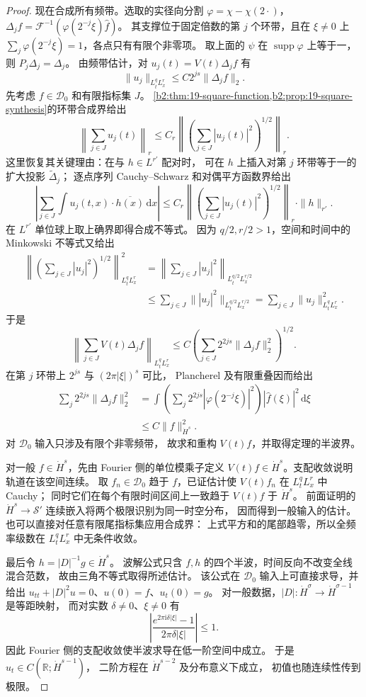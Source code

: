 \begin{proof}
现在合成所有频带。选取的实径向分割
\(\varphi=\chi-\chi(2\cdot)\)，
\(\Delta_jf=\mathcal F^{-1}(\varphi(2^{-j}\xi)\widehat f)\)。
其支撑位于固定倍数的第 \(j\) 个环带，且在 \(\xi\ne0\) 上
\(\sum_j\varphi(2^{-j}\xi)=1\)，各点只有有限个非零项。
取上面的 \(\psi\) 在 \(\operatorname{supp}\varphi\) 上等于一，
则 \(P_j\Delta_j=\Delta_j\)。
由频带估计，对 \(u_j(t)=V(t)\Delta_jf\) 有
\[
 \|u_j\|_{L^q_tL^r_x}\le C2^{js}\|\Delta_jf\|_2.
\]
先考虑 \(f\in\mathcal D_0\) 和有限指标集 \(J\)。
\cref{b2:thm:19-square-function,b2:prop:19-square-synthesis}的环带合成界给出
\[
 \left\|\sum_{j\in J}u_j(t)\right\|_r
 \le C_r\left\|\left(\sum_{j\in J}|u_j(t)|^2\right)^{1/2}\right\|_r.
\]
这里恢复其关键理由：在与 \(h\in L^{r'}\) 配对时，
可在 \(h\) 上插入对第 \(j\) 环带等于一的扩大投影 \(\widetilde\Delta_j\)；
逐点序列 Cauchy--Schwarz 和对偶平方函数界给出
\[
 \left|\sum_{j\in J}\int u_j(t,x)\cdot\overline{h(x)}\,\mathrm dx\right|
 \le C_r
 \left\|\left(\sum_{j\in J}|u_j(t)|^2\right)^{1/2}\right\|_r
 \cdot\|h\|_{r'}.
\]
在 \(L^{r'}\) 单位球上取上确界即得合成不等式。
因为 \(q/2,r/2>1\)，空间和时间中的 Minkowski 不等式又给出
\[
 \begin{aligned}
 \left\|\left(\sum_{j\in J}|u_j|^2\right)^{1/2}\right\|_{L^q_tL^r_x}^2
 &=\left\|\sum_{j\in J}|u_j|^2\right\|_{L^{q/2}_tL^{r/2}_x}\\
 &\le\sum_{j\in J}\||u_j|^2\|_{L^{q/2}_tL^{r/2}_x}
 =\sum_{j\in J}\|u_j\|_{L^q_tL^r_x}^2.
 \end{aligned}
\]
于是
\[
 \left\|\sum_{j\in J}V(t)\Delta_jf\right\|_{L^q_tL^r_x}
 \le C\left(\sum_{j\in J}2^{2js}\|\Delta_jf\|_2^2\right)^{1/2}.
\]
在第 \(j\) 环带上 \(2^{js}\) 与 \((2\pi|\xi|)^s\) 可比，
Plancherel 及有限重叠因而给出
\[
 \begin{aligned}
 \sum_j2^{2js}\|\Delta_jf\|_2^2
 &=\int\left(\sum_j2^{2js}|\varphi(2^{-j}\xi)|^2\right)
                    |\widehat f(\xi)|^2\,\mathrm d\xi\\
 &\le C\|f\|_{\dot H^s}^2.
 \end{aligned}
\]
对 \(\mathcal D_0\) 输入只涉及有限个非零频带，
故求和重构 \(V(t)f\)，并取得定理的半波界。

对一般 \(f\in\dot H^s\)，先由 Fourier 侧的单位模乘子定义
\(V(t)f\in\dot H^s\)。支配收敛说明轨道在该空间连续。
取 \(f_n\in\mathcal D_0\) 趋于 \(f\)，已证估计使
\(V(t)f_n\) 在 \(L^q_tL^r_x\) 中 Cauchy；
同时它们在每个有限时间区间上一致趋于 \(V(t)f\) 于 \(\dot H^s\)。
前面证明的 \(\dot H^s\to\mathcal S'\) 连续嵌入将两个极限识别为同一时空分布，
因而得到一般输入的估计。
也可以直接对任意有限尾指标集应用合成界：
上式平方和的尾部趋零，所以全频率级数在 \(L^q_tL^r_x\) 中无条件收敛。

最后令 \(h=|D|^{-1}g\in\dot H^s\)。
波解公式只含 \(f,h\) 的四个半波，时间反向不改变全线混合范数，
故由三角不等式取得所述估计。
该公式在 \(\mathcal D_0\) 输入上可直接求导，并给出
\(u_{tt}+|D|^2u=0\)、\(u(0)=f\)、\(u_t(0)=g\)。
对一般数据，\(|D|:\dot H^\sigma\to\dot H^{\sigma-1}\) 是等距映射，
而对实数 \(\delta\ne0\)、\(\xi\ne0\) 有
\[
 \left|\frac{e^{2\pi\mathrm i\delta|\xi|}-1}{2\pi\delta|\xi|}\right|\le1.
\]
因此 Fourier 侧的支配收敛使半波求导在低一阶空间中成立。
于是 \(u_t\in C(\mathbb R;\dot H^{s-1})\)，
二阶方程在 \(\dot H^{s-2}\) 及分布意义下成立，
初值也随连续性传到极限。
\end{proof}
